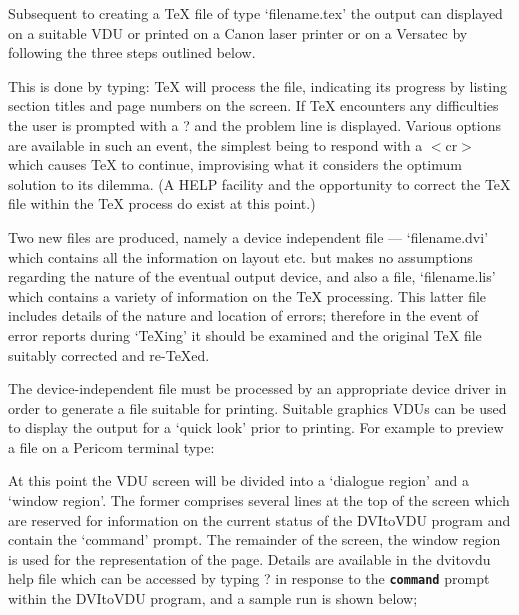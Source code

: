 \vfill\eject


Subsequent to creating a {\TeX} file of type `filename.tex' 
the output can displayed on a suitable VDU or printed on a Canon 
laser printer or
on a Versatec by following the three steps outlined below.


This is done by typing:
\medskip
{}
{\TeX} will process the file, indicating its progress by
listing section titles and page numbers on the screen. 
If {\TeX} encounters any difficulties the user is prompted with a ?
and the problem line is displayed.
Various options are available in such an event, the simplest being to
respond with a $<$cr$>$ which causes {\TeX} to continue, improvising what it
considers the optimum solution to its dilemma. 
(A HELP facility and the opportunity to
correct the {\TeX} file within the {\TeX} process do exist at this point.)
 
Two new files
are produced, namely a device independent file --- `filename.dvi' which
contains all the information on layout etc. but makes no assumptions 
regarding the nature of the eventual output device, and
also a file, `filename.lis' which contains a variety of information on 
the {\TeX} processing.
This latter file includes details of the nature and location of errors;
therefore in the event of error reports during `\TeX ing' it should be
examined and the original {\TeX} file suitably corrected and re-\TeX ed.



The device-independent file must be processed by an appropriate device
driver in order to generate a file suitable for printing.
Suitable graphics VDUs can be used to display the output for a `quick look'
prior to printing.
For example to preview a file on a Pericom terminal type:
\medskip
{}

At this point the VDU screen will be divided into a `dialogue region' and 
a `window region'.
The former comprises  several lines at the top of the screen which are
reserved for information on the current status of the DVItoVDU program and 
contain the `command' prompt.
The remainder of the screen, the window region is used for the representation of
the page.
Details are available in the dvitovdu help file which
can be accessed by typing ? in response to the {\bf{\tt command}} 
prompt within the DVItoVDU program, and a sample run is shown below;
\medskip
{}

